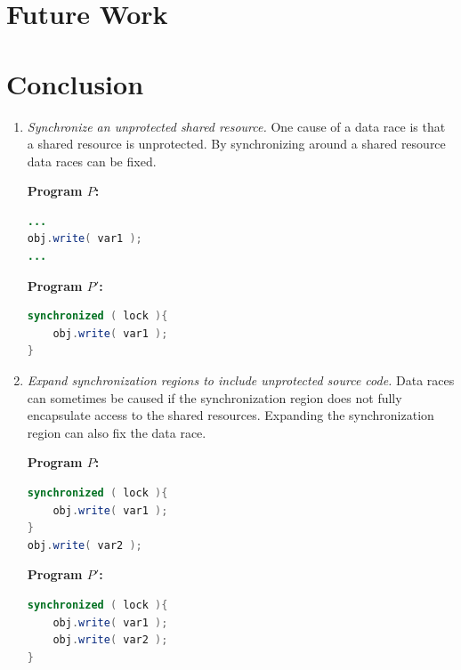 \documentclass[10pt, conference, compsocconf]{IEEEtran}
\begin{document}
\section{Future Work}




\section{Conclusion}



\begin{enumerate}
	\item \textit{Synchronize an unprotected shared resource.} One cause of a data race is that a shared resource is unprotected. By synchronizing around a shared resource data races can be fixed.

\vspace{2mm}
	\begin{minipage}{3.70cm}
	\footnotesize{\textbf{ Program $P$:}}
\begin{lstlisting}[language=Java]
...
obj.write( var1 );
...

\end{lstlisting}
\end{minipage}\hfill
\begin{minipage}{3.70cm}
\footnotesize{\textbf{ Program $P'$:}}
\begin{lstlisting}[language=Java]
synchronized ( lock ){
	obj.write( var1 );
}
\end{lstlisting}
\end{minipage}


	\item \textit{Expand synchronization regions to include unprotected source code.} Data races can sometimes be caused if the synchronization region does not fully encapsulate access to the shared resources. Expanding the synchronization region can also fix the data race.

\vspace{2mm}
	\begin{minipage}{3.70cm}
\footnotesize{\textbf{ Program $P$:}}
\begin{lstlisting}[language=Java]
synchronized ( lock ){
	obj.write( var1 );
}
obj.write( var2 );
\end{lstlisting}
\end{minipage}\hfill
\begin{minipage}{3.70cm}
\footnotesize{\textbf{ Program $P'$:}}
\begin{lstlisting}[language=Java]
synchronized ( lock ){
	obj.write( var1 );
	obj.write( var2 );
}
\end{lstlisting}
\end{minipage}



\end{enumerate}
\end{document}
